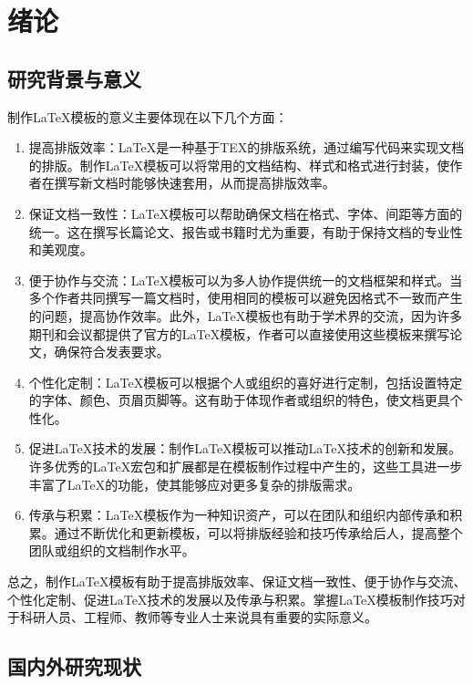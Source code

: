 \cleardoublepage
{} \song  %

\chapter{绪论}

\section{研究背景与意义}

制作LaTeX模板的意义主要体现在以下几个方面：

\begin{enumerate}[fullwidth,itemindent=\parindent]
    \item 提高排版效率：LaTeX是一种基于TEX的排版系统，通过编写代码来实现文档的排版。制作LaTeX模板可以将常用的文档结构、样式和格式进行封装，使作者在撰写新文档时能够快速套用，从而提高排版效率。
    \item 保证文档一致性：LaTeX模板可以帮助确保文档在格式、字体、间距等方面的统一。这在撰写长篇论文、报告或书籍时尤为重要，有助于保持文档的专业性和美观度。
    \item 便于协作与交流：LaTeX模板可以为多人协作提供统一的文档框架和样式。当多个作者共同撰写一篇文档时，使用相同的模板可以避免因格式不一致而产生的问题，提高协作效率。此外，LaTeX模板也有助于学术界的交流，因为许多期刊和会议都提供了官方的LaTeX模板，作者可以直接使用这些模板来撰写论文，确保符合发表要求。
    \item 个性化定制：LaTeX模板可以根据个人或组织的喜好进行定制，包括设置特定的字体、颜色、页眉页脚等。这有助于体现作者或组织的特色，使文档更具个性化。
    \item 促进LaTeX技术的发展：制作LaTeX模板可以推动LaTeX技术的创新和发展。许多优秀的LaTeX宏包和扩展都是在模板制作过程中产生的，这些工具进一步丰富了LaTeX的功能，使其能够应对更多复杂的排版需求。
    \item 传承与积累：LaTeX模板作为一种知识资产，可以在团队和组织内部传承和积累。通过不断优化和更新模板，可以将排版经验和技巧传承给后人，提高整个团队或组织的文档制作水平。
\end{enumerate}

总之，制作LaTeX模板有助于提高排版效率、保证文档一致性、便于协作与交流、个性化定制、促进LaTeX技术的发展以及传承与积累。掌握LaTeX模板制作技巧对于科研人员、工程师、教师等专业人士来说具有重要的实际意义。

\section{国内外研究现状}

